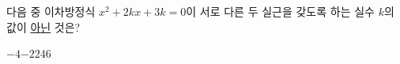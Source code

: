 \hspace*{2mm}\begin{minipage}[t]{\dimexpr\linewidth-2mm\relax}\vspace{0pt}
다음 중 이차방정식 $x^2+2kx+3k=0$이 서로 다른 두 실근을 갖도록 하는 실수 $k$의 값이 \underline{아닌} 것은?
\begin{choices32}{$-4$}{$-2$}{$2$}{$4$}{$6$}\end{choices32}\end{minipage}
